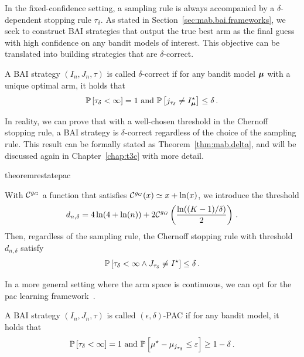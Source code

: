 In the fixed-confidence setting, a sampling rule is always accompanied by a $\delta$-dependent stopping rule $\tau_{\delta}$. As stated in Section~\ref{sec:mab.bai.frameworks}, we seek to construct BAI strategies that output the true best arm as the final guess with high confidence on any bandit models of interest. This objective can be translated into building strategies that are $\delta$-correct.

\begin{definition}\label{def:mab.delta}
\begin{leftbar}[defnbar]
A BAI strategy $(I_n,J_n,\tau)$ is called $\delta$-correct if for any bandit model ${\boldsymbol \mu}$ with a unique optimal arm, it holds that
\[
	\mathbb{P}\left[\tau_\delta < \infty\right] = 1 \text{ and } \mathbb{P}\left[j_{\tau_\delta}\neq I_{{\boldsymbol \mu}}^{\star}\right] \leq \delta\,.
\]
\end{leftbar}
\end{definition}

In reality, we can prove that with a well-chosen threshold in the Chernoff stopping rule, a BAI strategy is $\delta$-correct regardless of the choice of the sampling rule. This result can be formally stated as Theorem~\ref{thm:mab.delta}, and will be discussed again in Chapter~\ref{chap:t3c} with more detail.

\begin{restatable}{theorem}{restatepac}\label{thm:mab.delta}
\begin{leftbar}[theorembar]
With $\mathcal{C}^{g_G}$ a function that satisfies $\mathcal{C}^{g_G}(x) \simeq x+\ln(x)$, we introduce the threshold
\begin{equation}
    d_{n,\delta} = 4\ln(4+\ln(n)) + 2 \mathcal{C}^{g_G}\left(\frac{\ln((K-1)/\delta)}{2}\right)\,.\label{def:mab.threshold_d}
\end{equation}
Then, regardless of the sampling rule, the Chernoff stopping rule with threshold $d_{n,\delta}$ satisfy 
\[ 
    \mathbb{P}\left[\tau_{\delta} < \infty \wedge J_{\tau_{\delta}} \neq I^\star\right] \leq \delta\,.
\]
\end{leftbar}
\end{restatable}

In a more general setting where the arm space is continuous, we can opt for the \gls{pac} learning framework~\citep{valiant1984pac}.

\begin{definition}\label{def:mab.pac}
\begin{leftbar}[defnbar]
A BAI strategy $(I_n,J_n,\tau)$ is called $(\epsilon,\delta)$-PAC if for any bandit model, it holds that
\[
	\mathbb{P}\left[\tau_\delta < \infty\right] = 1 \text{ and } \mathbb{P}\left[\mu^\star-\mu_{j_{\tau_\delta}}\leq \varepsilon\right] \geq 1-\delta\,.
\]
\end{leftbar}
\end{definition}

